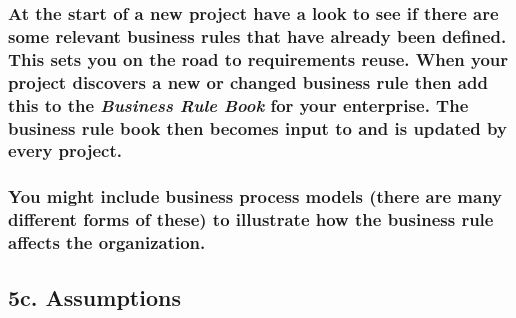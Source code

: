 \documentclass[
]{article}
\begin{document}
\hypertarget{at-the-start-of-a-new-project-have-a-look-to-see-if-there-are-some-relevant-business-rules-that-have-already-been-defined.-this-sets-you-on-the-road-to-requirements-reuse.-when-your-project-discovers-a-new-or-changed-business-rule-then-add-this-to-the-business-rule-book-for-your-enterprise.-the-business-rule-book-then-becomes-input-to-and-is-updated-by-every-project.}{%
\subsubsection{\texorpdfstring{At the start of a new project have a look
to see if there are some relevant business rules that have already been
defined. This sets you on the road to requirements reuse. When your
project discovers a new or changed business rule then add this to the
\emph{Business Rule Book} for your enterprise. The business rule book
then becomes input to and is updated by every
project.}{At the start of a new project have a look to see if there are some relevant business rules that have already been defined. This sets you on the road to requirements reuse. When your project discovers a new or changed business rule then add this to the Business Rule Book for your enterprise. The business rule book then becomes input to and is updated by every project.}}\label{at-the-start-of-a-new-project-have-a-look-to-see-if-there-are-some-relevant-business-rules-that-have-already-been-defined.-this-sets-you-on-the-road-to-requirements-reuse.-when-your-project-discovers-a-new-or-changed-business-rule-then-add-this-to-the-business-rule-book-for-your-enterprise.-the-business-rule-book-then-becomes-input-to-and-is-updated-by-every-project.}}

\hypertarget{you-might-include-business-process-models-there-are-many-different-forms-of-these-to-illustrate-how-the-business-rule-affects-the-organization.}{%
\subsubsection{You might include business process models (there are many
different forms of these) to illustrate how the business rule affects
the
organization.}\label{you-might-include-business-process-models-there-are-many-different-forms-of-these-to-illustrate-how-the-business-rule-affects-the-organization.}}

\hypertarget{c.-assumptions}{%
\subsection{5c. Assumptions}\label{c.-assumptions}}
\end{document}
